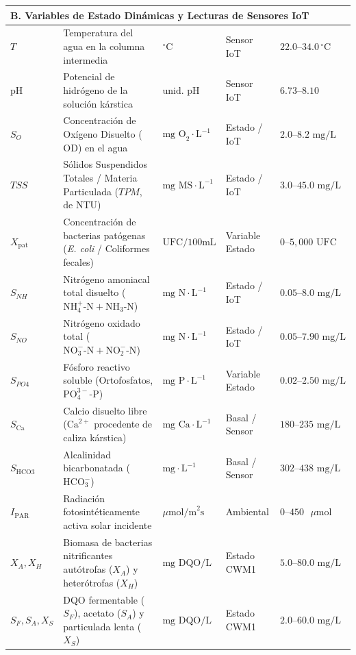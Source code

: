 \documentclass[11pt,letterpaper]{article}
\begin{document}
{\begin{longtable}{p{1.85cm} p{5.95cm} p{2.15cm} p{2.15cm} p{2.55cm}}
\multicolumn{5}{l}{\textbf{B. Variables de Estado Dinámicas y Lecturas de Sensores IoT}} \\
\hline
$T$ & Temperatura del agua en la columna intermedia & $^\circ\text{C}$ & Sensor IoT & $22.0\text{--}34.0\,^\circ\text{C}$ \\
$\text{pH}$ & Potencial de hidrógeno de la solución kárstica & $\text{unid. pH}$ & Sensor IoT & $6.73\text{--}8.10$ \\
$S_O$ & Concentración de Oxígeno Disuelto ($\text{OD}$) en el agua & $\text{mg O}_2\cdot\text{L}^{-1}$ & Estado / IoT & $2.0\text{--}8.2\text{ mg/L}$ \\
$TSS$ & Sólidos Suspendidos Totales / Materia Particulada ($TPM$, de NTU) & $\text{mg MS}\cdot\text{L}^{-1}$ & Estado / IoT & $3.0\text{--}45.0\text{ mg/L}$ \\
$X_{\text{pat}}$ & Concentración de bacterias patógenas (\textit{E. coli} / Coliformes fecales) & $\text{UFC}/100\text{mL}$ & Variable Estado & $0\text{--}5,000\text{ UFC}$ \\
$S_{NH}$ & Nitrógeno amoniacal total disuelto ($\text{NH}_4^+\text{-N} + \text{NH}_3\text{-N}$) & $\text{mg N}\cdot\text{L}^{-1}$ & Estado / IoT & $0.05\text{--}8.0\text{ mg/L}$ \\
$S_{NO}$ & Nitrógeno oxidado total ($\text{NO}_3^-\text{-N} + \text{NO}_2^-\text{-N}$) & $\text{mg N}\cdot\text{L}^{-1}$ & Estado / IoT & $0.05\text{--}7.90\text{ mg/L}$ \\
$S_{PO4}$ & Fósforo reactivo soluble (Ortofosfatos, $\text{PO}_4^{3-}\text{-P}$) & $\text{mg P}\cdot\text{L}^{-1}$ & Variable Estado & $0.02\text{--}2.50\text{ mg/L}$ \\
$S_{\text{Ca}}$ & Calcio disuelto libre ($\text{Ca}^{2+}$ procedente de caliza kárstica) & $\text{mg Ca}\cdot\text{L}^{-1}$ & Basal / Sensor & $180\text{--}235\text{ mg/L}$ \\
$S_{\text{HCO3}}$ & Alcalinidad bicarbonatada ($\text{HCO}_3^-$) & $\text{mg}\cdot\text{L}^{-1}$ & Basal / Sensor & $302\text{--}438\text{ mg/L}$ \\
$I_{\text{PAR}}$ & Radiación fotosintéticamente activa solar incidente & $\mu\text{mol/m}^2\text{s}$ & Ambiental & $0\text{--}450\text{ }\mu\text{mol}$ \\
$X_A, X_H$ & Biomasa de bacterias nitrificantes autótrofas ($X_A$) y heterótrofas ($X_H$) & $\text{mg DQO/L}$ & Estado CWM1 & $5.0\text{--}80.0\text{ mg/L}$ \\
$S_F, S_A, X_S$ & DQO fermentable ($S_F$), acetato ($S_A$) y particulada lenta ($X_S$) & $\text{mg DQO/L}$ & Estado CWM1 & $2.0\text{--}60.0\text{ mg/L}$ \\
\hline


\end{longtable}}
\end{document}
